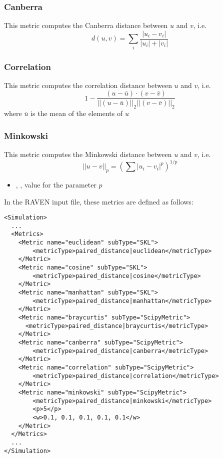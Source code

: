 \subsubsection{Canberra}
This metric computes the Canberra distance between $u$ and $v$, i.e.
\begin{equation}
  d(u,v) = \sum_i \frac{|u_i-v_i|}{|u_i|+|v_i|}
\end{equation}


\subsubsection{Correlation}
This metric computes the correlation distance between $u$ and $v$, i.e.
\begin{equation}
  1 - \frac{(u - \bar{u}) \cdot (v - \bar{v})}{{||(u - \bar{u})||}_2 {||(v - \bar{v})||}_2}
\end{equation}
where $\bar{u}$ is the mean of the elements of $u$


\subsubsection{Minkowski}
This metric computes the Minkowski distance between $u$ and $v$, i.e.
\begin{equation}
  {||u-v||}_p = (\sum{|u_i - v_i|^p})^{1/p}
\end{equation}


\begin{itemize}
  \item {}, , value for the parameter $p$
\end{itemize}

In the RAVEN input file, these metrics are defined as follows:
\begin{lstlisting}[style=XML]
<Simulation>
  ...
  <Metrics>
    <Metric name="euclidean" subType="SKL">
        <metricType>paired_distance|euclidean</metricType>
    </Metric>
    <Metric name="cosine" subType="SKL">
        <metricType>paired_distance|cosine</metricType>
    </Metric>
    <Metric name="manhattan" subType="SKL">
        <metricType>paired_distance|manhattan</metricType>
    </Metric>
    <Metric name="braycurtis" subType="ScipyMetric">
      <metricType>paired_distance|braycurtis</metricType>
    </Metric>
    <Metric name="canberra" subType="ScipyMetric">
        <metricType>paired_distance|canberra</metricType>
    </Metric>
    <Metric name="correlation" subType="ScipyMetric">
        <metricType>paired_distance|correlation</metricType>
    </Metric>
    <Metric name="minkowski" subType="ScipyMetric">
        <metricType>paired_distance|minkowski</metricType>
        <p>5</p>
        <w>0.1, 0.1, 0.1, 0.1, 0.1</w>
    </Metric>
  </Metrics>
  ...
</Simulation>
\end{lstlisting}

